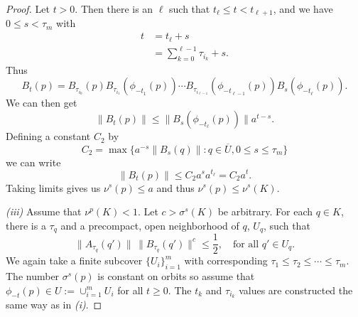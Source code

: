 \begin{proof}
	Let \(t> 0\). Then there is an \(\ell\) such that \(t_\ell \leq t< t_{\ell +1}\), and we have \(0\leq s < \tau_m\) with 
	\begin{equation}
		\begin{aligned}
			t &= t_\ell + s \\
			&= \sum_{k=0}^{\ell - 1} \tau_{i_k} +s .
		\end{aligned}
	\end{equation}
	Thus
	\begin{equation}
		B_t(p) = B_{\tau_{i_0}}(p) B_{\tau_{i_1}}(\phi_{-t_1}(p)) \cdots B_{\tau_{i_{\ell-1}}}(\phi_{-t_{\ell-1}}(p)) B_s(\phi_{-t_\ell}(p)).
	\end{equation}
	We can then get 
	\begin{equation}
		\| B_t(p) \| \leq \| B_s(\phi_{-t_\ell}(p)) \| a^{t-s}.
	\end{equation}
	Defining a constant \(C_2\) by 
	\begin{equation}
		C_2 = \max\{ a^{-s} \| B_s(q) \| : q\in \overline U , 0 \leq s \leq \tau_m\}
	\end{equation}
	we can write
	\begin{equation}
		\|B_t(p) \| \leq C_2 a^s a^{t_\ell} = C_2 a^t.
	\end{equation}
	Taking limits gives us \(\nu^s(p) \leq a\) and thus \(\nu^s(p) \leq \nu^s(K).\)
	
	\emph{(iii)} Assume that \(\nu^p(K) < 1\). Let \(c > \sigma^s(K)\) be arbitrary. For each \(q\in K\), there is a \(\tau_q\) and a precompact, open neighborhood of \(q\), \(U_q\), such that 
	\begin{equation}
		\|A_{\tau_q} (q')\|\, \|B_{\tau_q}(q')\|^c \leq \frac 12, \quad \text{for all } q'\in U_q.
	\end{equation}
	We again take a finite subcover \(\{U_i\}_{i=1}^m\) with corresponding \(\tau_1\leq \tau_2 \leq \cdots \leq \tau_m.\) The number \(\sigma^s(p)\) is constant on orbits so assume that \(\phi_{-t}(p) \in U := \cup_{i=1}^mU_i\) for all \(t\geq 0.\) The \(t_k\) and \(\tau_{i_k}\) values are constructed the same way as in \emph{(i)}.
	

\end{proof}
